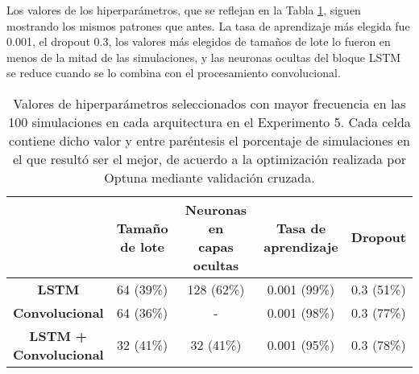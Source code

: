 \documentclass[../../main.tex]{subfiles}
\begin{document}
Los valores de los hiperparámetros, que se reflejan en la Tabla
\ref{tab:hyperparams_exp5}, siguen mostrando los mismos patrones que antes. La tasa de
aprendizaje más elegida fue 0.001, el dropout 0.3, los valores más elegidos de tamaños de
lote lo fueron en menos de la mitad de las simulaciones, y las neuronas ocultas del bloque
LSTM se reduce cuando se lo combina con el procesamiento convolucional.

\begin{table}[H]
    \centering
    \renewcommand{\arraystretch}{1.2}
    \begin{tabular}{|c|c|c|c|c|}
        \hline
            & \makecell{\textbf{Tamaño}\\\textbf{de lote}}
            & \makecell{\textbf{Neuronas en}\\\textbf{capas ocultas}}
            & \makecell{\textbf{Tasa de}\\\textbf{aprendizaje}}
            & \textbf{Dropout} \\ \hline\hline
        \textbf{LSTM}
            & 64 (39\%) & 128 (62\%) & 0.001 (99\%) & 0.3 (51\%) \\ \hline
        \textbf{Convolucional}
            & 64 (36\%) & -          & 0.001 (98\%) & 0.3 (77\%) \\ \hline
        \makecell{\textbf{LSTM +}\\\textbf{Convolucional}}
            & 32 (41\%) & 32 (41\%)  & 0.001 (95\%) & 0.3 (78\%) \\
        \hline
    \end{tabular}
    \caption{Valores de hiperparámetros seleccionados con mayor frecuencia en las 100
    simulaciones en cada arquitectura en el Experimento 5. Cada celda contiene dicho valor
    y entre paréntesis el porcentaje de simulaciones en el que resultó ser el mejor, de
    acuerdo a la optimización realizada por Optuna mediante validación cruzada.}
    \label{tab:hyperparams_exp5}
\end{table}
\end{document}
